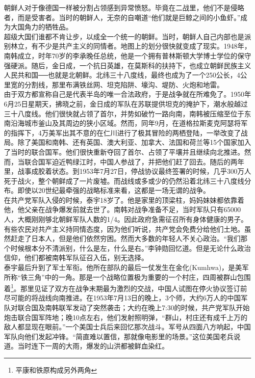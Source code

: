 朝鲜人对于像德国一样被分割占领感到异常愤怒。毕竟在二战里，他们不是侵略者，而是受害者。当时的朝鲜人，无奈的自嘲道“他们就是巨鲸之间的小鱼虾。”成为大国角力的牺牲品。\\

超级大国们谁都不肯让步，以成全一个统一的朝鲜。当时，朝鲜人自己内部也是派别林立，有不少是共产主义的同情者。地图上的划分很快就变成了现实。1948年，南韩成立，时年70岁的李承晚任总统，他是一个拥有普林斯顿大学博士学位的保守强硬派。随后，金日成，一个抗日英雄，在莫斯科的扶持下，也成立朝鲜民族主义人民共和国──也就是北朝鲜。北纬三十八度线，最终也成为了一个250公长，4公里宽的分割线，那里布满铁丝网、坦克陷阱、壕沟、堤防、火炮和地雷。\\

由于双方都宣称自己是代表半岛的唯一合法政府，于是战争就在所难免了。1950年6月25日星期天，拂晓之前，金日成的军队在苏联提供坦克的掩护下，潮水般越过三十八度线。他们很快就占领了首尔，并势如破竹一路向南，南韩被压缩至位于东南沿海城市釜山及其周边的狭小区域。然而，同年9月，在道格拉斯麦克阿瑟将军的指挥下，4万美军出其不意的在仁川进行了极其冒险的两栖登陆，一举改变了战局。除了美国和南韩、还有英国、澳大利亚、加拿大、法国和荷兰等15个国家加入了当时的联合国军。他们很快重新夺回了首尔、占领了平壤并且继续向北推进。然而，当联合国军迫近鸭绿江时，中国人参战了，并把他们赶了回去。随后的两年里，战事成胶着状态。到1953年7月27日，停战协议最终签署的时候，几乎300万人死于战火，整个朝鲜成了一片废墟。而战线或多或少的仍然沿着北纬三十八度线分布。即使以20世纪最牵强的战略标准来看，这都是一场无谓的战争。\\

在共产党军队入侵的时候，泰宇18岁了。他是家里的顶梁柱，妈妈妹妹都依靠着他，他父亲在战争爆发前就去世了。南韩对战争准备不足，当时军队只有65000人，大概刚刚够北朝鲜军队人数的1/4。因此政府急需征召所有身体健康的男子。有些农民对共产主义持同情态度，因为他们听说，共产党会免费分给他们土地。虽然赶走了日本人，但是他们依然穷困。然而大多数的年轻人不关心政治。“我们那个时候根本分不清派别，什么是左，什么是右。”李钟勋回忆道。但是无论什么政治信仰，他们都被南韩军队征召入伍，别无选择。\\

泰宇最后升到了军士军衔。他所在部队的最后一仗发生在金化(Kumhwa)，是美军所称“铁三角”中的一角。那是一个战略位置极为重要的一个村庄，四周被群山包围着\footnote{平康和铁原构成另外两角}。那里见证了双方在战争末期最为激烈的交战，中国人试图在停火协议签订前尽可能的将战线向南推进。在1953年7月13日的晚上，3个师，大约6万人的中国军队对联合国及南韩联军发动了突然袭击；大约在晚上7:30的时候，共产党军队开始炮击联合国军阵地；晚10点左右，他们发射照明弹，“群山，村庄还有成千上万的敌人都显现在眼前。”一个美国士兵后来回忆那次战斗。军号从四面八方响起，中国军队向他们发起冲锋。“简直难以置信，那就像电影里的场景。”这位美国老兵说道。当时连下一周的大雨，爆发的山洪都被鲜血染红。\\

